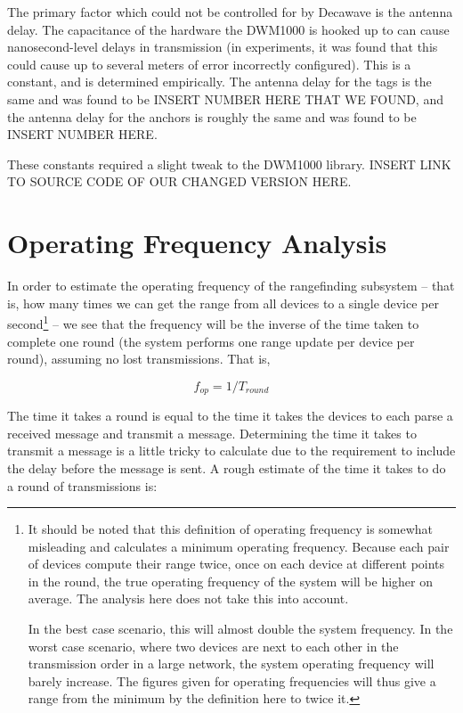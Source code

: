 The primary factor which could not be controlled for by Decawave is the antenna delay. The capacitance of the hardware the DWM1000 is hooked up to can cause nanosecond-level delays in transmission (in experiments, it was found that this could cause up to several meters of error incorrectly configured). This is a constant, and is determined empirically. The antenna delay for the tags is the same and was found to be INSERT NUMBER HERE THAT WE FOUND, and the antenna delay for the anchors is roughly the same and was found to be INSERT NUMBER HERE.

These constants required a slight tweak to the DWM1000 library. INSERT LINK TO SOURCE CODE OF OUR CHANGED VERSION HERE.

\section{Operating Frequency Analysis}
\label{OperatingFrequencyAnalysis}
In order to estimate the operating frequency of the rangefinding subsystem -- that is, how many times we can get the range from all devices to a single device per second\footnote{It should be noted that this definition of operating frequency is somewhat misleading and calculates a minimum operating frequency. Because each pair of devices compute their range twice, once on each device at different points in the round, the true operating frequency of the system will be higher on average. The analysis here does not take this into account. 

In the best case scenario, this will almost double the system frequency. In the worst case scenario, where two devices are next to each other in the transmission order in a large network, the system operating frequency will barely increase. The figures given for operating frequencies will thus give a range from the minimum by the definition here to twice it.} -- we see that the frequency will be the inverse of the time taken to complete one round (the system performs one range update per device per round), assuming no lost transmissions. That is,

\[
 	f_{op} = 1/T_{round}
\]

The time it takes a round is equal to the time it takes the devices to each parse a received message and transmit a message. Determining the time it takes to transmit a message is a little tricky to calculate due to the requirement to include the delay before the message is sent. A rough estimate of the time it takes to do a round of transmissions is:

